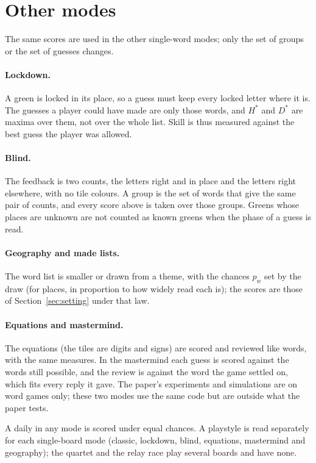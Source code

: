 \documentclass[11pt]{article}
\theoremstyle{definition}
\theoremstyle{remark}
\begin{document}
\section{Other modes}\label{sec:modes}

The same scores are used in the other single-word modes; only the set of groups or the
set of guesses changes.

\paragraph{Lockdown.} A green is locked in its place, so a guess must keep every locked
letter where it is. The guesses a player could have made are only those words, and
$H^*$ and $D^*$ are maxima over them, not over the whole list. Skill is thus measured
against the best guess the player was allowed.

\paragraph{Blind.} The feedback is two counts, the letters right and in place and the
letters right elsewhere, with no tile colours. A group is the set of words that give the
same pair of counts, and every score above is taken over those groups. Greens whose
places are unknown are not counted as known greens when the phase of a guess is read.

\paragraph{Geography and made lists.} The word list is smaller or drawn from a theme, with
the chances $p_w$ set by the draw (for places, in proportion to how widely read each is);
the scores are those of Section~\ref{sec:setting} under that law.

\paragraph{Equations and mastermind.} The equations (the tiles are digits and signs) are
scored and reviewed like words, with the same measures. In the mastermind each guess is scored
against the words still possible, and the review is against the word the game settled on, which
fits every reply it gave. The paper's experiments and simulations are on word games only; these
two modes use the same code but are outside what the paper tests.

A daily in any mode is scored under equal chances. A playstyle is read separately for each
single-board mode (classic, lockdown, blind, equations, mastermind and geography); the quartet and
the relay race play several boards and have none.
\end{document}
